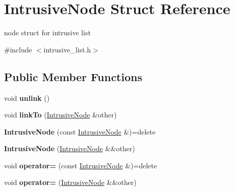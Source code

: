 \hypertarget{structIntrusiveNode}{}\section{Intrusive\+Node Struct Reference}
\label{structIntrusiveNode}


node struct for intrusive list  




{\ttfamily \#include $<$intrusive\+\_\+list.\+h$>$}

\subsection*{Public Member Functions}
\begin{DoxyCompactItemize}
\item 
\hypertarget{structIntrusiveNode_a5895f6ff9890770857a50e5c3f156836}{}void {\bfseries unlink} ()\label{structIntrusiveNode_a5895f6ff9890770857a50e5c3f156836}

\item 
\hypertarget{structIntrusiveNode_a74b5290c17bc39e1057509b297613419}{}void {\bfseries link\+To} (\hyperlink{structIntrusiveNode}{Intrusive\+Node} \&other)\label{structIntrusiveNode_a74b5290c17bc39e1057509b297613419}

\item 
\hypertarget{structIntrusiveNode_a2d8e30fa2e5650ced0d8d8f65cf9f6bf}{}{\bfseries Intrusive\+Node} (const \hyperlink{structIntrusiveNode}{Intrusive\+Node} \&)=delete\label{structIntrusiveNode_a2d8e30fa2e5650ced0d8d8f65cf9f6bf}

\item 
\hypertarget{structIntrusiveNode_a263eb1cff1181d332551567bf6f59902}{}{\bfseries Intrusive\+Node} (\hyperlink{structIntrusiveNode}{Intrusive\+Node} \&\&other)\label{structIntrusiveNode_a263eb1cff1181d332551567bf6f59902}

\item 
\hypertarget{structIntrusiveNode_a833aaa568b8b4e682b7581d90510b735}{}void {\bfseries operator=} (const \hyperlink{structIntrusiveNode}{Intrusive\+Node} \&)=delete\label{structIntrusiveNode_a833aaa568b8b4e682b7581d90510b735}

\item 
\hypertarget{structIntrusiveNode_a91df3d90f43b66e20de7e9c3eca9a1ee}{}void {\bfseries operator=} (\hyperlink{structIntrusiveNode}{Intrusive\+Node} \&\&other)\label{structIntrusiveNode_a91df3d90f43b66e20de7e9c3eca9a1ee}

\end{DoxyCompactItemize}
